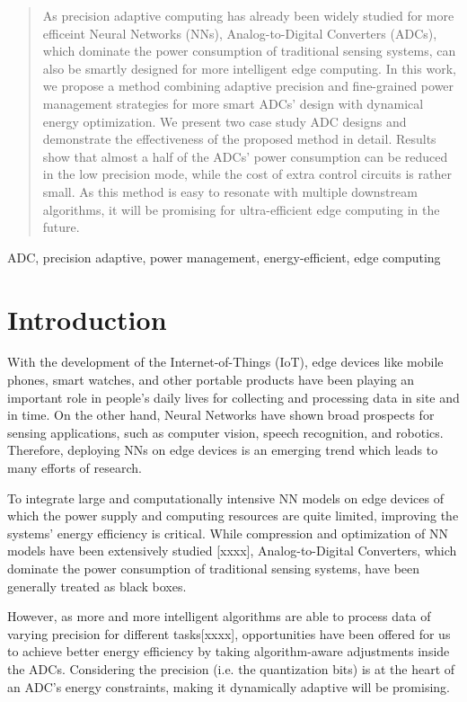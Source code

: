 \documentclass[conference]{IEEEtran}
\begin{document}
\begin{abstract}
As precision adaptive computing has already been widely studied for more efficeint Neural Networks (NNs), Analog-to-Digital Converters (ADCs), which dominate the power consumption of traditional sensing systems, can also be smartly designed for more intelligent edge computing. In this work, we propose a method combining adaptive precision and fine-grained power management strategies for more smart ADCs' design with dynamical energy optimization. We present two case study ADC designs and demonstrate the effectiveness of the proposed method in detail. Results show that almost a half of the ADCs’ power consumption can be reduced in the low precision mode, while the cost of extra control circuits is rather small. As this method is easy to resonate with multiple downstream algorithms, it will be promising for ultra-efficient edge computing in the future.
\end{abstract}

\begin{IEEEkeywords}
ADC, precision adaptive, power management, energy-efficient, edge computing
\end{IEEEkeywords}

\section{Introduction}

With the development of the Internet-of-Things (IoT), edge devices like mobile phones, smart watches, and other portable products have been playing an important role in people’s daily lives for collecting and processing data in site and in time. On the other hand, Neural Networks have shown broad prospects for sensing applications, such as computer vision, speech recognition, and robotics. Therefore, deploying NNs on edge devices is an emerging trend which leads to many efforts of research. 

To integrate large and computationally intensive NN models on edge devices of which the power supply and computing resources are quite limited, improving the systems' energy efficiency is critical. While compression and optimization of NN models have been extensively studied [xxxx], Analog-to-Digital Converters, which dominate the power consumption of traditional sensing systems, have been generally treated as black boxes. 

However, as more and more intelligent algorithms are able to process data of varying precision for different tasks[xxxx], opportunities have been offered for us to achieve better energy efficiency by taking algorithm-aware adjustments inside the ADCs. Considering the precision (i.e. the quantization bits) is at the heart of an ADC’s energy constraints, making it dynamically adaptive will be promising.
\end{document}
